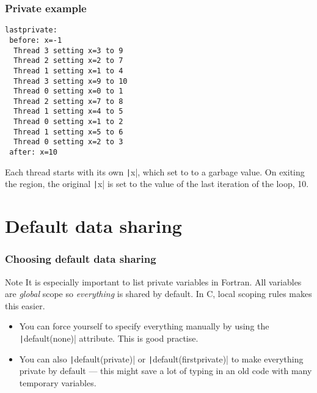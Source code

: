 \documentclass{beamer}
\begin{document}
\begin{frame}[fragile]
\frametitle{Private example}
\begin{verbatim}
lastprivate:
 before: x=-1
  Thread 3 setting x=3 to 9
  Thread 2 setting x=2 to 7
  Thread 1 setting x=1 to 4
  Thread 3 setting x=9 to 10
  Thread 0 setting x=0 to 1
  Thread 2 setting x=7 to 8
  Thread 1 setting x=4 to 5
  Thread 0 setting x=1 to 2
  Thread 1 setting x=5 to 6
  Thread 0 setting x=2 to 3
 after: x=10
\end{verbatim}
Each thread starts with its own \texttt|x|, which set to to a garbage value.
On exiting the region, the original \texttt|x| is set to the value of the last iteration of the loop, 10.
\end{frame}

\section{Default data sharing}
\begin{frame}
\frametitle{Choosing default data sharing}
\begin{alertblock}{Note}
It is especially important to list private variables in Fortran.
All variables are \emph{global} scope so \emph{everything} is shared by default.
In C, local scoping rules makes this easier.
\end{alertblock}

\begin{itemize}
  \item You can force yourself to specify everything manually by using the \texttt|default(none)| attribute. This is good practise.
  \item You can also \texttt|default(private)| or \texttt|default(firstprivate)| to make everything private by default --- this might save a lot of typing in an old code with many temporary variables.
\end{itemize}

\end{frame}

\end{document}
